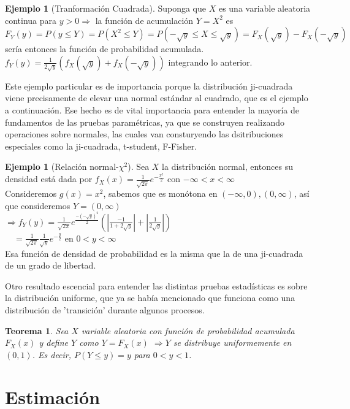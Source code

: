 \documentclass[11pt,a4paper,oneside]{report}
\theoremstyle{definition}
\newtheorem{ejemplo}[definicion]{Ejemplo}
\theoremstyle{plain}
\newtheorem{teorema}[definicion]{Teorema}
\theoremstyle{remark}
\begin{document}
\begin{ejemplo}[Tranformación Cuadrada]
  Suponga que $X$ es una variable aleatoria continua para $y>0 \Rightarrow$ la función de 
  acumulación $Y=X^2$ es\\
  $F_Y(y)=P(y\leq Y)=P(X^2\leq Y)=P(-\sqrt{y}\leq X \leq \sqrt{y})=F_X(\sqrt{y})-F_X(-\sqrt{y})$ sería entonces la función 
  de probabilidad acumulada.\\
  $f_Y(y)=\frac{1}{2\sqrt{y}}(f_X(\sqrt{y})+f_X(-\sqrt{y}))$ integrando lo anterior.
\end{ejemplo}
Este ejemplo particular es de importancia porque la distribución ji-cuadrada viene precisamente de elevar una normal estándar 
al cuadrado, que es el ejemplo a continuación. Ese hecho es de vital importancia para entender la mayoría de fundamentos de las pruebas 
paramétricas, ya que se construyen realizando operaciones sobre normales, las cuales van consturyendo las dsitribuciones especiales
como la ji-cuadrada, t-student, F-Fisher.

\begin{ejemplo}[Relación normal-$\chi^{2}$]
  Sea $X$ la distribución normal, entonces su densidad está dada por 
  $f_X(x)=\frac{1}{\sqrt{2\pi}}e^{-\frac{x^2}{2}}$ con $-\infty<x<\infty$\\
  Consideremos $g(x)=x^2$, sabemos que es monótona en $(-\infty,0),(0,\infty)$, así que consideremos $Y=(0,\infty)$\\
  $\Rightarrow f_Y(y)=\frac{1}{\sqrt{2\pi}}e^{\frac{-(-\sqrt{y})^{2}}{2}}(|\frac{-1}{1+2\sqrt{y}}|+|\frac{1}{2\sqrt{y}}|)$\\
  $\quad = \frac{1}{\sqrt{2\pi}} \frac{1}{\sqrt{y}}e^{-\frac{y}{2}}$ en $0<y<\infty$\\
  Esa función de densidad de probabilidad es la misma que la de una ji-cuadrada de un grado de libertad.
\end{ejemplo}

Otro resultado escencial para entender las distintas pruebas estadísticas es sobre la distribución uniforme,
que ya se había mencionado que funciona como una distribución de 'transición' durante algunos procesos.

\begin{teorema}
  Sea $X$ variable aleatoria con función de probabilidad acumulada $F_X(x)$ y define $Y$ como
  $Y=F_X(x)$ $\Rightarrow Y$ se distribuye uniformemente en $(0,1)$. Es decir, 
  $P(Y\leq y)=y$ para $0<y<1$.
\end{teorema}

\chapter{Estimación}
\end{document}
